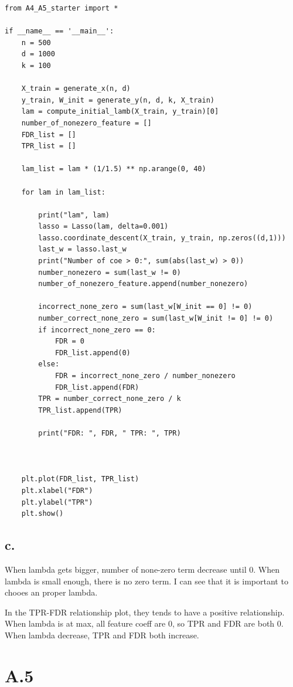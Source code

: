 \documentclass{article}
\begin{document}
\begin{verbatim}
from A4_A5_starter import *

if __name__ == '__main__':
	n = 500
	d = 1000
	k = 100
	
	X_train = generate_x(n, d)
	y_train, W_init = generate_y(n, d, k, X_train)
	lam = compute_initial_lamb(X_train, y_train)[0]
	number_of_nonezero_feature = []
	FDR_list = []
	TPR_list = []
	
	lam_list = lam * (1/1.5) ** np.arange(0, 40)
	
	for lam in lam_list:
	
		print("lam", lam)
		lasso = Lasso(lam, delta=0.001)
		lasso.coordinate_descent(X_train, y_train, np.zeros((d,1)))
		last_w = lasso.last_w
		print("Number of coe > 0:", sum(abs(last_w) > 0))
		number_nonezero = sum(last_w != 0)
		number_of_nonezero_feature.append(number_nonezero)
		
		incorrect_none_zero = sum(last_w[W_init == 0] != 0)
		number_correct_none_zero = sum(last_w[W_init != 0] != 0)
		if incorrect_none_zero == 0:
			FDR = 0
			FDR_list.append(0)
		else:
			FDR = incorrect_none_zero / number_nonezero
			FDR_list.append(FDR)
		TPR = number_correct_none_zero / k
		TPR_list.append(TPR)
		
		print("FDR: ", FDR, " TPR: ", TPR)
	
	
	
	plt.plot(FDR_list, TPR_list)
	plt.xlabel("FDR")
	plt.ylabel("TPR")
	plt.show()

\end{verbatim}


\subsection*{c.}

When lambda gets bigger, number of none-zero term decrease until 0. When lambda is small enough, there is no zero term. I can see that it is important to chooes an proper lambda.


In the TPR-FDR relationship plot, they tends to have a positive relationship. When lambda is at max, all feature coeff are 0, so TPR and FDR are both 0. When lambda decrease, TPR and FDR both increase.

\section*{A.5}
\end{document}
